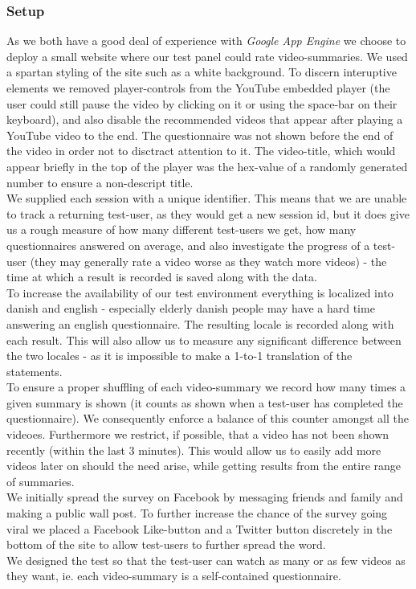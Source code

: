 \subsubsection{Setup}
%
As we both have a good deal of experience with \textit{Google App Engine} we choose to deploy a small website where our test panel could rate video-summaries. We used a spartan styling of the site such as a white background.
%
%
%
%
To discern interuptive elements we removed player-controls from the YouTube embedded player (the user could still pause the video by clicking on it or using the space-bar on their keyboard), and also disable the recommended videos that appear after playing a YouTube video to the end. The questionnaire was not shown before the end of the video in order not to disctract attention to it. The video-title, which would appear briefly in the top of the player was the hex-value of a randomly generated number to ensure a non-descript title.\\
We supplied each session with a unique identifier. This means that we are unable to track a returning test-user, as they would get a new session id, but it does give us a rough measure of how many different test-users we get, how many questionnaires answered on average, and also investigate the progress of a test-user (they may generally rate a video worse as they watch more videos) - the time at which a result is recorded is saved along with the data.\\
To increase the availability of our test environment everything is localized into danish and english - especially elderly danish people may have a hard time answering an english questionnaire.
%
%
The resulting locale is recorded along with each result. This will also allow us to measure any significant difference between the two locales - as it is impossible to make a 1-to-1 translation of the statements.\\
To ensure a proper shuffling of each video-summary we record how many times a given summary is shown (it counts as shown when a test-user has completed the questionnaire). We consequently enforce a balance of this counter amongst all the videoes. Furthermore we restrict, if possible, that a video has not been shown recently (within the last 3 minutes). This would allow us to easily add more videos later on should the need arise, while getting results from the entire range of summaries.\\
%
%
%
%
We initially spread the survey on Facebook by messaging friends and family and making a public wall post. To further increase the chance of the survey going viral we placed a Facebook Like-button and a Twitter button discretely in the bottom of the site to allow test-users to further spread the word.\\
We designed the test so that the test-user can watch as many or as few videos as they want, ie. each video-summary is a self-contained questionnaire.
%
